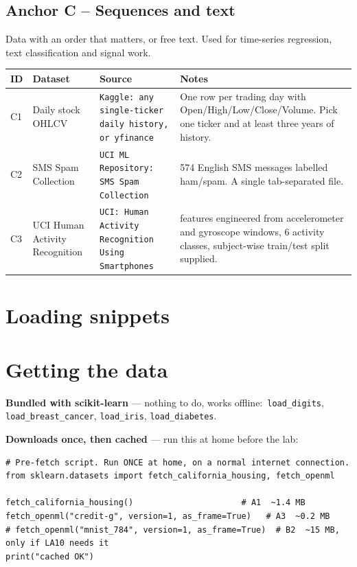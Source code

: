 \documentclass[11pt,a4paper]{article}
\begin{document}
\subsection*{Anchor C -- Sequences and text}
Data with an order that matters, or free text. Used for time-series regression, text classification and signal work.\\[0.3em]
\begin{center}\footnotesize\begin{tabular}{@{}p{0.7cm}>{\raggedright\arraybackslash}p{3.1cm}>{\raggedright\arraybackslash}p{4.1cm}>{\raggedright\arraybackslash}p{6.4cm}@{}}\toprule\textbf{ID} & \textbf{Dataset} & \textbf{Source} & \textbf{Notes}\\
\midrule
C1 & Daily stock OHLCV & \texttt{\footnotesize Kaggle: any single-ticker daily history, or yfinance} & One row per trading day with Open/High/Low/Close/Volume. Pick one ticker and at least three years of history.\\
C2 & SMS Spam Collection & \texttt{\footnotesize UCI ML Repository: SMS Spam Collection} & 5{,}574 English SMS messages labelled ham/spam. A single tab-separated file.\\
C3 & UCI Human Activity Recognition & \texttt{\footnotesize UCI: Human Activity Recognition Using Smartphones} & 561 features engineered from accelerometer and gyroscope windows, 6 activity classes, subject-wise train/test split supplied.\\
\bottomrule\end{tabular}\end{center}

\section*{Loading snippets}

\section*{Getting the data}

\textbf{Bundled with scikit-learn} --- nothing to do, works offline:\ \texttt{load\_digits}, \texttt{load\_breast\_cancer}, \texttt{load\_iris}, \texttt{load\_diabetes}.

\textbf{Downloads once, then cached} --- run this at home before the lab:

\begin{lstlisting}
# Pre-fetch script. Run ONCE at home, on a normal internet connection.
from sklearn.datasets import fetch_california_housing, fetch_openml

fetch_california_housing()                      # A1  ~1.4 MB
fetch_openml("credit-g", version=1, as_frame=True)   # A3  ~0.2 MB
# fetch_openml("mnist_784", version=1, as_frame=True)  # B2  ~15 MB, only if LA10 needs it
print("cached OK")
\end{lstlisting}
\end{document}
